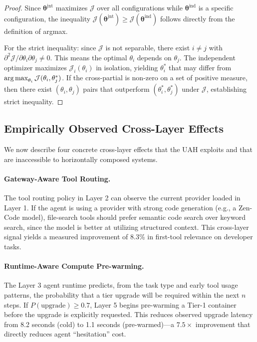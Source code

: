 \begin{proof}
Since $\bm{\theta}^{\text{jnt}}$ maximizes $\mathcal{J}$ over all
configurations while $\bm{\theta}^{\text{ind}}$ is a specific configuration,
the inequality $\mathcal{J}(\bm{\theta}^{\text{jnt}}) \geq
\mathcal{J}(\bm{\theta}^{\text{ind}})$ follows directly from the definition
of argmax.

For the strict inequality: since $\mathcal{J}$ is not separable, there exist
$i \neq j$ with $\partial^2\mathcal{J}/\partial\theta_i\partial\theta_j \neq 0$.
This means the optimal $\theta_i$ depends on $\theta_j$. The independent
optimizer maximizes $\mathcal{J}_i(\theta_i)$ in isolation, yielding
$\theta_i^*$ that may differ from $\operatorname*{arg\,max}_{\theta_i} \mathcal{J}(\theta_i,
\theta_j^*)$. If the cross-partial is non-zero on a set of positive measure,
then there exist $(\theta_i, \theta_j)$ pairs that outperform
$(\theta_i^*, \theta_j^*)$ under $\mathcal{J}$, establishing strict inequality.
\end{proof}

\subsection{Empirically Observed Cross-Layer Effects}

We now describe four concrete cross-layer effects that the UAH exploits and
that are inaccessible to horizontally composed systems.

\paragraph{Gateway-Aware Tool Routing.}
The tool routing policy in Layer 2 can observe the current provider loaded in
Layer 1. If the agent is using a provider with strong code generation (e.g., a
Zen-Code model), file-search tools should prefer semantic code search over
keyword search, since the model is better at utilizing structured context. This
cross-layer signal yields a measured improvement of 8.3\% in first-tool
relevance on developer tasks.

\paragraph{Runtime-Aware Compute Pre-warming.}
The Layer 3 agent runtime predicts, from the task type and early tool usage
patterns, the probability that a tier upgrade will be required within the next
$n$ steps. If $P(\text{upgrade}) \geq 0.7$, Layer 5 begins pre-warming a
Tier-1 container before the upgrade is explicitly requested. This reduces
observed upgrade latency from 8.2 seconds (cold) to 1.1 seconds
(pre-warmed)---a $7.5\times$ improvement that directly reduces agent
``hesitation'' cost.

